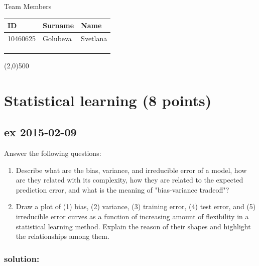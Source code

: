 \documentclass[a4paper,12pt,titlepage]{article} %
\begin{document}
\begin{titlepage}
		\vspace{20pt}
		
		\begin{center}
			{\large Team Members}
		\end{center}
		\begin{tabularx}{\textwidth}{|X|X|X|}
			\hline
			ID & Surname & Name\\
			\hline
			10460625 & Golubeva & Svetlana\\
			\hline
			&  & \\
			\hline
			&  & \\
			\hline
			&  & \\
			\hline
		\end{tabularx}
		
		\vspace{\fill}
		\begin{center}
			\line(2,0){500}
		\end{center}
		
	\end{titlepage}
\tableofcontents

\newpage
\section{Statistical learning (8 points)}
\subsection{ex 2015-02-09}
Answer the following questions:
\begin{enumerate}
\item Describe what are the bias, variance, and irreducible error of a model, how are they related with its complexity, how they are related to the expected prediction error, and what is the meaning of "bias-variance tradeoff"?
\item Draw a plot of (1) bias, (2) variance, (3) training error, (4) test error, and (5) irreducible error curves as a function of increasing amount of flexibility in a statistical learning method. Explain the reason of their shapes and highlight the relationships among them.
\end{enumerate}

\subsubsection{solution:}
\end{document}
